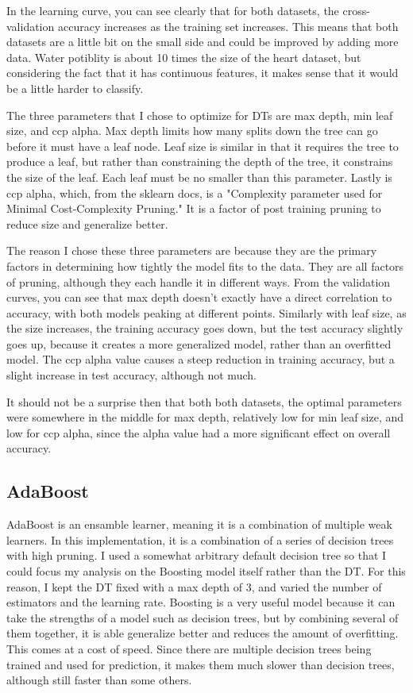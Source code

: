 \documentclass[
	letterpaper, %
]{mlreport}
\begin{document}
In the learning curve, you can see clearly that for both datasets, the cross-validation accuracy increases as the training set increases. This means that both datasets are a little bit on the small side and could be improved by adding more data. Water potiblity is about 10 times the size of the heart dataset, but considering the fact that it has continuous features, it makes sense that it would be a little harder to classify.

The three parameters that I chose to optimize for DTs are max depth, min leaf size, and ccp alpha. Max depth limits how many splits down the tree can go before it must have a leaf node. Leaf size is similar in that it requires the tree to produce a leaf, but rather than constraining the depth of the tree, it constrains the size of the leaf. Each leaf must be no smaller than this parameter. Lastly is ccp alpha, which, from the sklearn docs, is a "Complexity parameter used for Minimal Cost-Complexity Pruning." It is a factor of post training pruning to reduce size and generalize better.

The reason I chose these three parameters are because they are the primary factors in determining how tightly the model fits to the data. They are all factors of pruning, although they each handle it in different ways. From the validation curves, you can see that max depth doesn't exactly have a direct correlation to accuracy, with both models peaking at different points. Similarly with leaf size, as the size increases, the training accuracy goes down, but the test accuracy slightly goes up, because it creates a more generalized model, rather than an overfitted model. The ccp alpha value causes a steep reduction in training accuracy, but a slight increase in test accuracy, although not much.

It should not be a surprise then that both both datasets, the optimal parameters were somewhere in the middle for max depth, relatively low for min leaf size, and low for ccp alpha, since the alpha value had a more significant effect on overall accuracy.

\subsection{AdaBoost}
AdaBoost is an ensamble learner, meaning it is a combination of multiple weak learners. In this implementation, it is a combination of a series of decision trees with high pruning. I used a somewhat arbitrary default decision tree so that I could focus my analysis on the Boosting model itself rather than the DT. For this reason, I kept the DT fixed with a max depth of 3, and varied the number of estimators and the learning rate. Boosting is a very useful model because it can take the strengths of a model such as decision trees, but by combining several of them together, it is able generalize better and reduces the amount of overfitting. This comes at a cost of speed. Since there are multiple decision trees being trained and used for prediction, it makes them much slower than decision trees, although still faster than some others.
\end{document}

